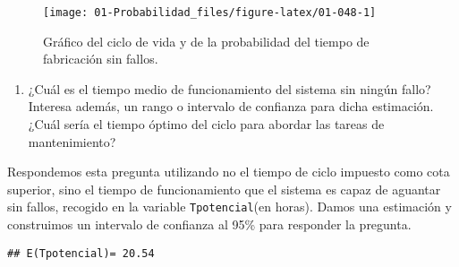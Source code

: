 \documentclass[
]{book}
\newenvironment{Shaded}{\begin{snugshade}}{\end{snugshade}}
\newcommand{\DecValTok}[1]{\textcolor[rgb]{0.00,0.00,0.81}{#1}}
\newcommand{\FloatTok}[1]{\textcolor[rgb]{0.00,0.00,0.81}{#1}}
\newcommand{\FunctionTok}[1]{\textcolor[rgb]{0.00,0.00,0.00}{#1}}
\newcommand{\NormalTok}[1]{#1}
\newcommand{\OtherTok}[1]{\textcolor[rgb]{0.56,0.35,0.01}{#1}}
\newcommand{\SpecialCharTok}[1]{\textcolor[rgb]{0.00,0.00,0.00}{#1}}
\newcommand{\StringTok}[1]{\textcolor[rgb]{0.31,0.60,0.02}{#1}}
\providecommand{\tightlist}{%
  \setlength{\itemsep}{0pt}\setlength{\parskip}{0pt}}
\theoremstyle{definition}
\theoremstyle{definition}
\theoremstyle{definition}
\theoremstyle{definition}
\theoremstyle{remark}
\begin{document}
\begin{figure}

{\centering \texttt{[image: 01-Probabilidad\_files/figure-latex/01-048-1]} 

}

\caption{Gráfico del ciclo de vida y de la probabilidad del tiempo de fabricación sin fallos.}\label{fig:01-048}
\end{figure}

\begin{enumerate}
\def\labelenumi{\arabic{enumi}.}
\setcounter{enumi}{2}
\tightlist
\item
  ¿Cuál es el tiempo medio de funcionamiento del sistema sin ningún fallo? Interesa además, un rango o intervalo de confianza para dicha estimación. ¿Cuál sería el tiempo óptimo del ciclo para abordar las tareas de mantenimiento?
\end{enumerate}

Respondemos esta pregunta utilizando no el tiempo de ciclo impuesto como cota superior, sino el tiempo de funcionamiento que el sistema es capaz de aguantar sin fallos, recogido en la variable \texttt{Tpotencial}(en horas). Damos una estimación y construimos un intervalo de confianza al 95\% para responder la pregunta.

\begin{Shaded}
\end{Shaded}

\begin{verbatim}
## E(Tpotencial)= 20.54
\end{verbatim}
\end{document}
